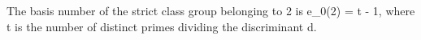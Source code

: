 The basis number of the strict class group belonging to 2 is e_0(2) = t - 1, where t is the number of distinct primes dividing the discriminant d.
